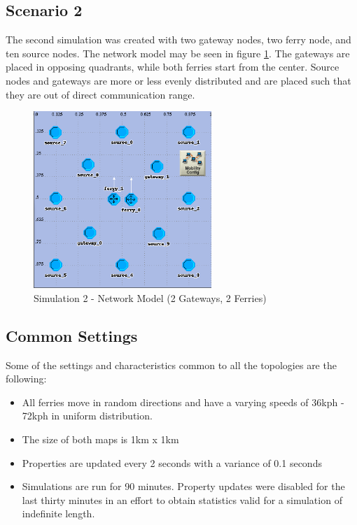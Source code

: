 \subsection{Scenario 2}		%

The second simulation was created with two gateway nodes, two ferry node, and ten source nodes.
The network model may be seen in figure \ref{fig:scenario3}.
The gateways are placed in opposing quadrants, while both ferries start from the center.
Source nodes and gateways are more or less evenly distributed and are placed such that they are out of direct communication range.

\begin{figure}[ht]
    \centering
    \includegraphics[width=0.6\textwidth]{images/scenario3-top.png}
    \caption{Simulation 2 - Network Model (2 Gateways, 2 Ferries)}
    \label{fig:scenario3}
\end{figure}

\subsection{Common Settings}
\label{sec:commonsettings}

Some of the settings and characteristics common to all the topologies are the following:
\begin{itemize}
	\item All ferries move in random directions and have a varying speeds of 36kph - 72kph in uniform distribution.
	\item The size of both maps is 1km x 1km
	\item Properties are updated every 2 seconds with a variance of 0.1 seconds
	\item Simulations are run for 90 minutes. 
	Property updates were disabled for the last thirty minutes in an effort to obtain statistics valid for a simulation of indefinite length. 
\end{itemize}

